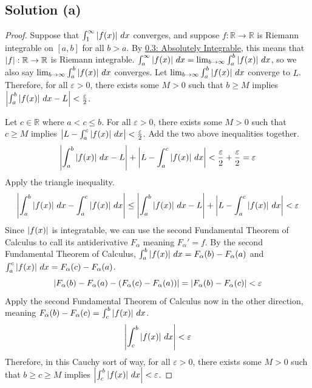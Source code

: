 \documentclass[11pt]{article}
\begin{document}
    \subsection{Solution (a)}
        \begin{proof}
            Suppose that $\int_{1}^{\infty} \left| f(x) \right|\,dx$ converges, and suppose $f : \mathbb{R} \to \mathbb{R}$ is Riemann integrable on $[a, b]$ for all $b > a$.
            By \hyperref[thm:3]{0.3: Absolutely Integrable}, this means that $\left| f \right|: \mathbb{R} \to \mathbb{R}$ is Riemann integrable.
            $\int_{a}^{\infty} \left| f(x) \right|\,dx = \lim_{b \to \infty} \int_{a}^{b} \left| f(x) \right|\,dx$, so we also say $\lim_{b \to \infty} \int_{a}^{b} \left| f(x) \right|\,dx$ converges.
            Let $\lim_{b \to \infty} \int_{a}^{b} \left| f(x) \right|\,dx$ converge to $L$.
            Therefore, for all $\varepsilon > 0$, there exists some $M > 0$ such that $b \geq M$ implies $\left| \int_{a}^{b} \left| f(x) \right|\,dx - L \right| < \frac{\varepsilon}{2}$.

            Let $c \in \mathbb{R}$ where $a < c \leq b$.
            For all $\varepsilon > 0$, there exists some $M > 0$ such that $c \geq M$ implies $\left| L - \int_{a}^{c} \left| f(x) \right|\,dx \right| < \frac{\varepsilon}{2}$.
            Add the two above inequalities together.
            \begin{equation}
                \left| \int_{a}^{b} \left| f(x) \right|\,dx - L \right| + \left| L - \int_{a}^{c} \left| f(x) \right|\,dx \right| < \frac{\varepsilon}{2} + \frac{\varepsilon}{2} = \varepsilon
            \end{equation}
            Apply the triangle inequality.
            \begin{equation}
                \left| \int_{a}^{b} \left| f(x) \right|\,dx - \int_{a}^{c} \left| f(x) \right|\,dx \right| \leq \left| \int_{a}^{b} \left| f(x) \right|\,dx - L \right| + \left| L - \int_{a}^{c} \left| f(x) \right|\,dx \right| < \varepsilon
            \end{equation}
            Since $\left| f(x) \right|$ is integratable, we can use the second Fundamental Theorem of Calculus to call its antiderivative $F_\alpha$ meaning $F_\alpha' = f$.
            By the second Fundamental Theorem of Calculus, $\int_{a}^{b} \left| f(x) \right|\,dx = F_\alpha(b) - F_\alpha(a)$ and $\int_{a}^{c} \left| f(x) \right|\,dx = F_\alpha(c) - F_\alpha(a)$.
            \begin{equation}
                \left| F_\alpha(b) - F_\alpha(a) - (F_\alpha(c) - F_\alpha(a)) \right| = \left| F_\alpha(b) - F_\alpha(c) \right| < \varepsilon
            \end{equation}
            Apply the second Fundamental Theorem of Calculus now in the other direction, meaning $F_\alpha(b) - F_\alpha(c) = \int_{c}^{b} \left| f(x) \right|\,dx$.
            \begin{equation}
                \left| \int_{c}^{b} \left| f(x) \right|\,dx \right| < \varepsilon
            \end{equation}
            Therefore, in this Cauchy sort of way, for all $\varepsilon > 0$, there exists some $M > 0$ such that $b \geq c \geq M$ implies $\left| \int_{c}^{b} \left| f(x) \right|\,dx \right| < \varepsilon$.


\end{proof}
\end{document}
